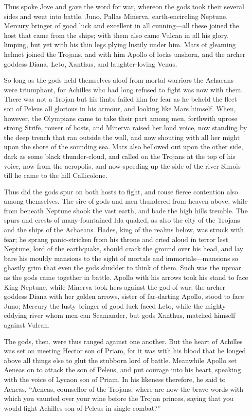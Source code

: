 Thus spoke Jove and gave the word for war, whereon the gods took their
several sides and went into battle. Juno, Pallas Minerva, earth-encircling
Neptune, Mercury bringer of good luck and excellent in all cunning—all
these joined the host that came from the ships; with them also came Vulcan
in all his glory, limping, but yet with his thin legs plying lustily under
him. Mars of gleaming helmet joined the Trojans, and with him Apollo of
locks unshorn, and the archer goddess Diana, Leto, Xanthus, and
laughter-loving Venus.

So long as the gods held themselves aloof from mortal warriors the
Achaeans were triumphant, for Achilles who had long refused to fight was
now with them. There was not a Trojan but his limbs failed him for fear as
he beheld the fleet son of Peleus all glorious in his armour, and looking
like Mars himself. When, however, the Olympians came to take their part
among men, forthwith uprose strong Strife, rouser of hosts, and Minerva
raised her loud voice, now standing by the deep trench that ran outside
the wall, and now shouting with all her might upon the shore of the
sounding sea. Mars also bellowed out upon the other side, dark as some
black thunder-cloud, and called on the Trojans at the top of his voice,
now from the acropolis, and now speeding up the side of the river Simois
till he came to the hill Callicolone.

Thus did the gods spur on both hosts to fight, and rouse fierce contention
also among themselves. The sire of gods and men thundered from heaven
above, while from beneath Neptune shook the vast earth, and bade the high
hills tremble. The spurs and crests of many-fountained Ida quaked, as also
the city of the Trojans and the ships of the Achaeans. Hades, king of the
realms below, was struck with fear; he sprang panic-stricken from his
throne and cried aloud in terror lest Neptune, lord of the earthquake,
should crack the ground over his head, and lay bare his mouldy mansions to
the sight of mortals and immortals—mansions so ghastly grim that
even the gods shudder to think of them. Such was the uproar as the gods
came together in battle. Apollo with his arrows took his stand to face
King Neptune, while Minerva took hers against the god of war; the
archer goddess Diana with her golden arrows, sister of far-darting Apollo,
stood to face Juno; Mercury the lusty bringer of good luck faced Leto,
while the mighty eddying river whom men can Scamander, but gods Xanthus,
matched himself against Vulcan.

The gods, then, were thus ranged against one another. But the heart of
Achilles was set on meeting Hector son of Priam, for it was with his blood
that he longed above all things else to glut the stubborn lord of battle.
Meanwhile Apollo set Aeneas on to attack the son of Peleus, and put
courage into his heart, speaking with the voice of Lycaon son of Priam. In
his likeness therefore, he said to Aeneas, “Aeneas, counsellor of the
Trojans, where are now the brave words with which you vaunted over your
wine before the Trojan princes, saying that you would fight Achilles son
of Peleus in single combat?”

